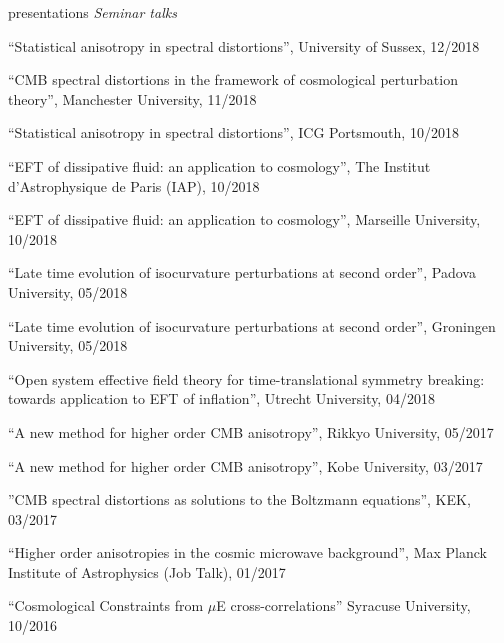 \documentclass[a4paper]{resume} %
\begin{document}
\begin{rSection}{presentations}
\noindent\textit{Seminar talks}

\begin{etaremune}
    \item
    ``Statistical anisotropy in spectral distortions'', University of Sussex, 12/2018
    \item
    ``CMB spectral distortions in the framework of cosmological perturbation theory'', Manchester University, 11/2018
    
    \item
    ``Statistical anisotropy in spectral distortions'', ICG Portsmouth, 10/2018

    \item
    ``EFT of dissipative fluid: an application to cosmology'', The Institut d'Astrophysique de Paris (IAP), 10/2018

    \item
    ``EFT of dissipative fluid: an application to cosmology'', Marseille University, 10/2018

    \item
    ``Late time evolution of isocurvature perturbations at second order'', Padova University, 05/2018

    \item
    ``Late time evolution of isocurvature perturbations at second order'', Groningen University, 05/2018

    \item
    ``Open system effective field theory for time-translational symmetry breaking: towards application to EFT of inflation'', Utrecht University, 04/2018

    \item
    ``A new method for higher order CMB anisotropy'', Rikkyo University, 05/2017

    \item
    ``A new method for higher order CMB anisotropy'', Kobe University, 03/2017  

    \item
    ''CMB spectral distortions as solutions to the Boltzmann equations'', KEK, 03/2017  

    \item
    ``Higher order anisotropies in the cosmic microwave background'', Max Planck Institute of Astrophysics (Job Talk), 01/2017

    \item
    ``Cosmological Constraints from $\mu$E cross-correlations'' Syracuse University, 10/2016


\end{etaremune}
\end{rSection}
\end{document}

